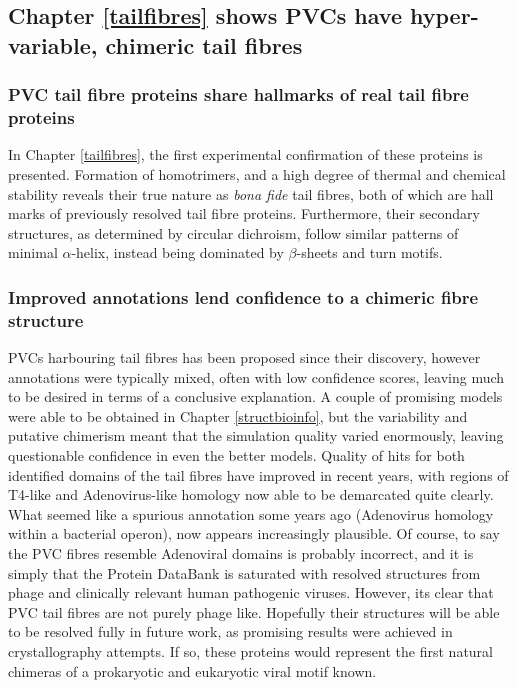 \subsection{Chapter \ref{tailfibres} shows PVCs have hyper-variable, chimeric tail fibres}
\subsubsection{PVC tail fibre proteins share hallmarks of real tail fibre proteins}
In Chapter \ref{tailfibres}, the first experimental confirmation of these proteins is presented. Formation of homotrimers, and a high degree of thermal and chemical stability reveals their true nature as \emph{bona fide} tail fibres, both of which are hall marks of previously resolved tail fibre proteins. Furthermore, their secondary structures, as determined by circular dichroism, follow similar patterns of minimal $\alpha$-helix, instead being dominated by $\beta$-sheets and turn motifs.

\subsubsection{Improved annotations lend confidence to a chimeric fibre structure}
PVCs harbouring tail fibres has been proposed since their discovery, however annotations were typically mixed, often with low confidence scores, leaving much to be desired in terms of a conclusive explanation. A couple of promising models were able to be obtained in Chapter \ref{structbioinfo}, but the variability and putative chimerism meant that the simulation quality varied enormously, leaving questionable confidence in even the better models. Quality of hits for both identified domains of the tail fibres have improved in recent years, with regions of T4-like and Adenovirus-like homology now able to be demarcated quite clearly. What seemed like a spurious annotation some years ago (Adenovirus homology within a bacterial operon), now appears increasingly plausible. Of course, to say the PVC fibres resemble Adenoviral domains is probably incorrect, and it is simply that the Protein DataBank is saturated with resolved structures from phage and clinically relevant human pathogenic viruses. However, its clear that PVC tail fibres are not purely phage like. Hopefully their structures will be able to be resolved fully in future work, as promising results were achieved in crystallography attempts. If so, these proteins would represent the first natural chimeras of a prokaryotic and eukaryotic viral motif known.

